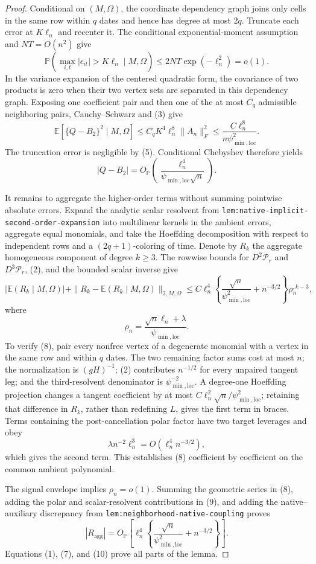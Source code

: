 \documentclass{article}
\begin{document}
\begin{proof}
Conditional on \((M,\Omega)\), the coordinate dependency graph joins only cells in the same row within \(q\) dates and hence has degree at most \(2q\).  Truncate each error at \(K\ell_n\) and recenter it.  The conditional exponential-moment assumption and \(NT=O(n^2)\) give
\[
 \mathbb P\!\left(\max_{i,t}|\epsilon_{it}|>K\ell_n\mid M,\Omega\right)
 \le 2NT\exp(-\ell_n^2)=o(1).
 \tag{5}
\]
In the variance expansion of the centered quadratic form, the covariance of two products is zero when their two vertex sets are separated in this dependency graph.  Exposing one coefficient pair and then one of the at most \(C_q\) admissible neighboring pairs, Cauchy--Schwarz and (3) give
\[
 \mathbb E\!\left[
 \{Q-B_2\}^2\mid M,\Omega\right]
 \le C_qK^4\ell_n^8\|A_n\|_F^2
 \le\frac{C\ell_n^8}{n\psi_{\min,\mathrm{loc}}^2}.
 \tag{6}
\]
The truncation error is negligible by (5).  Conditional Chebyshev therefore yields
\[
 |Q-B_2|=O_{\mathbb P}\!\left(
 \frac{\ell_n^4}{\psi_{\min,\mathrm{loc}}\sqrt n}\right).
 \tag{7}
\]

It remains to aggregate the higher-order terms without summing pointwise absolute errors.  Expand the analytic scalar resolvent from \texttt{lem:native-implicit-second-order-expansion} into multilinear kernels in the ambient errors, aggregate equal monomials, and take the Hoeffding decomposition with respect to independent rows and a \((2q+1)\)-coloring of time.  Denote by \(R_k\) the aggregate homogeneous component of degree \(k\ge3\).  The rowwise bounds for \(D^2\mathcal P_r\) and \(D^3\mathcal P_r\), (2), and the bounded scalar inverse give
\[
 |\mathbb E(R_k\mid M,\Omega)|
 +\|R_k-\mathbb E(R_k\mid M,\Omega)\|_{2,M,\Omega}
 \le C\ell_n^4
 \left\{\frac{\sqrt n}{\psi_{\min,\mathrm{loc}}^2}+n^{-3/2}\right\}
 \rho_n^{,k-3},
 \tag{8}
\]
where
\[
 \rho_n=\frac{\sqrt n\ell_n+\lambda}{\psi_{\min,\mathrm{loc}}}.
\]
To verify (8), pair every nonfree vertex of a degenerate monomial with a vertex in the same row and within \(q\) dates.  The two remaining factor sums cost at most \(n\); the normalization is \((gH)^{-1}\); (2) contributes \(n^{-1/2}\) for every unpaired tangent leg; and the third-resolvent denominator is \(\psi_{\min,\mathrm{loc}}^{-2}\).  A degree-one Hoeffding projection changes a tangent coefficient by at most \(C\ell_n^2\sqrt n/\psi_{\min,\mathrm{loc}}^2\); retaining that difference in \(R_k\), rather than redefining \(L\), gives the first term in braces.  Terms containing the post-cancellation polar factor have two target leverages and obey
\[
 \lambda n^{-2}\ell_n^3
 =O(\ell_n^4n^{-3/2}),
 \tag{9}
\]
which gives the second term.  This establishes (8) coefficient by coefficient on the common ambient polynomial.

The signal envelope implies \(\rho_n=o(1)\).  Summing the geometric series in (8), adding the polar and scalar-resolvent contributions in (9), and adding the native--auxiliary discrepancy from \texttt{lem:neighborhood-native-coupling} proves
\[
 |R_{\mathrm{agg}}|=O_{\mathbb P}\!\left[
 \ell_n^4\left\{\frac{\sqrt n}{\psi_{\min,\mathrm{loc}}^2}
 +n^{-3/2}\right\}\right].
 \tag{10}
\]
Equations (1), (7), and (10) prove all parts of the lemma.
\end{proof}
\end{document}
